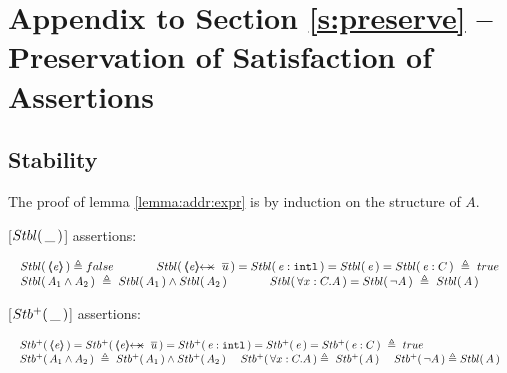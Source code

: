 \section{Appendix to Section \ref{s:preserve} -- Preservation of Satisfaction of Assertions}
\label{app:preserve}

\subsection{Stability}

The proof of lemma \ref{lemma:addr:expr} is by induction on the structure of $A$.

\vspace{.2cm}

\begin{definition}
\label{def:Basic}
[${Stbl(\, \_\, )}$] assertions: %

$
\begin{array}{l}
 \begin{array}{lll}
  \Stable {\inside{\re}}  \triangleq  false & \lclSPACE &   \Stable {\protectedFrom \re {\overline {u}}} =  
  \Stable  {\internal \re} =  %
    \Stable {\re}=   
     \Stable {\re:C}\   \triangleq \    true
 \end{array}
  \\
 \begin{array}{lcl}
 \Stable  {A_1  \wedge  A_2}\  \triangleq\     \Stable  { A_1}  \wedge    \Stable  {A_2}    &
\lclSPACE  &  
 \Stable  {\forall x:C.A} =\Stable  {\neg A} \   \triangleq\   \Stable A
 \end{array}
 \end{array}
$
\label{f:Basic}
 \end{definition}


 \begin{definition}
[${Stb^+(\, \_\, )}$] assertions: %

$
\begin{array}{l}
 \begin{array}{l}
  \Pos {\inside{\re}} =  \Pos {\protectedFrom \re {\overline {u}}} =  
  \Pos  {\internal \re} =   
    \Pos {\re}=   
     \Pos {\re:C}\   \triangleq \    true
 \end{array}
  \\
 \begin{array}{lll}
 \Pos  {A_1  \wedge  A_2}\  \triangleq\     \Pos  { A_1}  \wedge    \Pos  {A_2}   \  &    
 \Pos  {\forall x:C.A}   \triangleq\   \Pos A
\   &
  \Pos {\neg A}  \triangleq \Stable A %
 \end{array}
 \end{array}
 $
 \label{def:Pos}
\end{definition}

